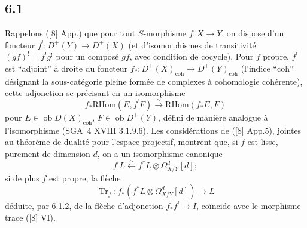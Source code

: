 \subsection*{6.1}
Rappelons ([8] App.) que pour tout $S$-morphisme $f:X\to Y$, on dispose d'un foncteur $f^!:D^+(Y)\longrightarrow D^+(X)$ (et d'isomorphismes de transitivité $(gf)^! = f^!g^!$ pour un composé $gf$, avec condition de cocycle). Pour $f$ propre, $f^!$ est ``adjoint'' à droite du foncteur $f_*:D^+(X)_{\mathrm{coh}}\to D^+(Y)_{\mathrm{coh}}$ (l'indice ``coh'' désignant la sous-catégorie pleine formée de complexes à cohomologie cohérente), cette adjonction se précisant en un isomorphisme
\begin{equation}
\tag{6.1.1}
f_*\mathrm{R}\underline{\mathrm{Hom}}(E,f^!F)\xrightarrow{\sim}\mathrm{R}\underline{\mathrm{Hom}}(f_*E,F)
\end{equation}
pour $E\in\operatorname{ob}D(X)_{\mathrm{coh}}$, $F\in\operatorname{ob}D^+(Y)$, défini de manière analogue à l'isomorphisme (SGA~4 XVIII 3.1.9.6). Les considérations de ([8] App.5), jointes au théorème de dualité pour l'espace projectif, montrent que, si $f$ est lisse, purement de dimension $d$, on a un isomorphisme canonique
\begin{equation}
\tag{6.1.2}
f^!L\xleftarrow{\sim} f^*L\otimes\Omega^d_{X/Y}[d];
\end{equation}
si de plus $f$ est propre, la flèche
\begin{equation}
\tag{6.1.3}
\operatorname{Tr}_f:f_*(f^*L\otimes\Omega^d_{X/Y}[d])\longrightarrow L
\end{equation}
déduite, par 6.1.2, de la flèche d'adjonction $f_*f^!\to I$, coïncide avec le morphisme trace ([8] VI).


